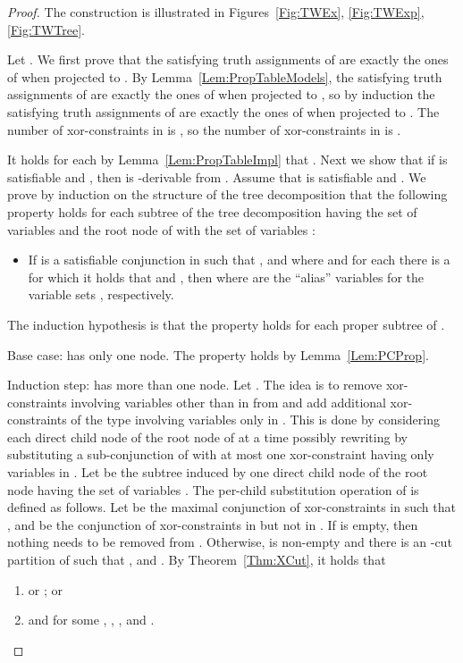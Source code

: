 \begin{proof}
The construction is illustrated in Figures~\ref{Fig:TWEx}, \ref{Fig:TWExp}, \ref{Fig:TWTree}.

Let .
We first prove that the satisfying truth assignments of  are
exactly the ones of  when projected to
. 
By Lemma~\ref{Lem:PropTableModels}, the satisfying truth assignments of  are exactly the ones of  when projected
to , so by induction the satisfying truth assignments of  are exactly the ones of  when projected
to .
The number of xor-constraints in  is , so the number of xor-constraints in  is .

It holds for each  by
Lemma~\ref{Lem:PropTableImpl} that .
Next we show that if  is satisfiable and , then  is -derivable from . 
Assume that  is satisfiable and .
\newcommand{\subtree}{\ensuremath{T'}}
We prove by induction on the structure of the tree decomposition that the
following property holds for each subtree  of the tree decomposition having the set of variables  and the root node of
 with the set of variables :
\begin{itemize}
\item If  is a satisfiable conjunction in  such that
,
and  
where  and for each  there is a
 for which it holds that 
and
, 
then 
where  are the ``alias'' variables for the variable sets
, respectively.
\end{itemize}
The induction hypothesis is that the property holds for each proper subtree of
.

Base case:  has only one node. The property holds by Lemma~\ref{Lem:PCProp}.


Induction step:  has more than one node.
Let . 
The idea is to remove xor-constraints involving variables other than in
 from  and add additional xor-constraints of the type involving variables only in .
This is done by considering each direct child node of the root node of  at
a time possibly rewriting  by substituting a sub-conjunction of  with at most one xor-constraint having only variables in .
Let  be the subtree induced by one direct child node of the root node
having the set of variables . The per-child substitution operation of  is defined as follows.
\newcommand{\phiA}{\phi^{\textup{a}}}
\newcommand{\phiB}{\phi^{\textup{b}}}
Let  be the maximal conjunction of xor-constraints in  such that
, and  be the conjunction of
xor-constraints in  but not in .
If  is empty, then nothing needs to be removed from .
Otherwise,  is non-empty and there is an -cut partition
 of  such that ,  and .
By Theorem~\ref{Thm:XCut}, it holds that
\begin{enumerate}
\item 
or ;
or
\item  and  for some ,
, , and .
\end{enumerate}


\end{proof}
